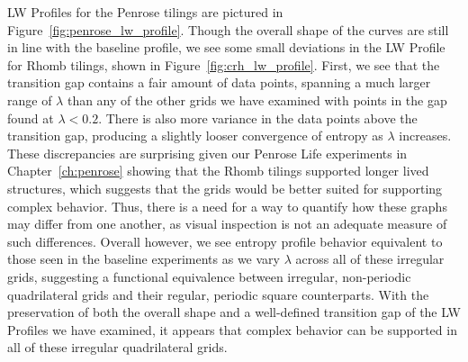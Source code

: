 \documentclass[a4paper,11pt]{article}
\begin{document}
LW Profiles for the Penrose tilings are pictured in Figure~\ref{fig:penrose_lw_profile}. Though the overall shape of the curves are still in line with the baseline profile, we see some small deviations in the LW Profile for Rhomb tilings, shown in Figure~\ref{fig:crh_lw_profile}. First, we see that the transition gap contains a fair amount of data points, spanning a much larger range of $\lambda$ than any of the other grids we have examined with points in the gap found at $\lambda < 0.2$. There is also more variance in the data points above the transition gap, producing a slightly looser convergence of entropy as $\lambda$ increases. These discrepancies are surprising given our Penrose Life experiments in Chapter~\ref{ch:penrose} showing that the Rhomb tilings supported longer lived structures, which suggests that the grids would be better suited for supporting complex behavior. Thus, there is a need for a way to quantify how these graphs may differ from one another, as visual inspection is not an adequate measure of such differences. Overall however, we see entropy profile behavior equivalent to those seen in the baseline experiments as we vary $\lambda$ across all of these irregular grids, suggesting a functional equivalence between irregular, non-periodic quadrilateral grids and their regular, periodic square counterparts. With the preservation of both the overall shape and a well-defined transition gap of the LW Profiles we have examined, it appears that complex behavior can be supported in all of these irregular quadrilateral grids.
\end{document}

